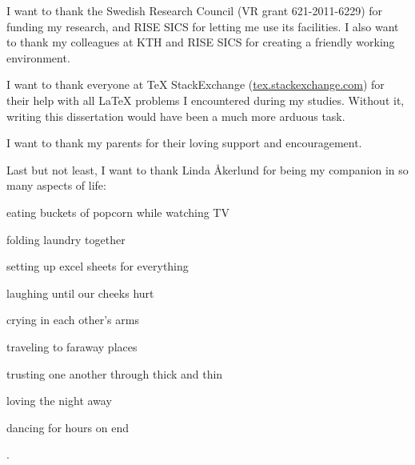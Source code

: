 \begin{acknowledgements}
  I want to thank the Swedish Research Council (VR grant 621-2011-6229) for
  funding my research, and RISE SICS for letting me use its facilities.
  I also want to thank my colleagues at KTH and RISE SICS for creating a
  friendly working environment.

  I want to thank everyone at \TeX{} StackExchange
  ({\url{tex.stackexchange.com}}) for their help with all
  \LaTeX{} problems I encountered during my studies.
  Without it, writing this dissertation would have been a much more arduous
  task.

  I want to thank my parents for their loving support and encouragement.

  Last but not least, I want to thank Linda \r{A}kerlund for being my companion
  in so many aspects of life:
  \begin{inlinelist}[itemjoin={, }, itemjoin*={, and}]
    \item eating buckets of popcorn while watching TV
    \item folding laundry together
    \item setting up excel sheets for everything
    \item laughing until our cheeks hurt
    \item crying in each other's arms
    \item traveling to faraway places
    \item trusting one another through thick and thin
    \item loving the night away
    \item dancing for hours on end
  \end{inlinelist}.
\end{acknowledgements}
